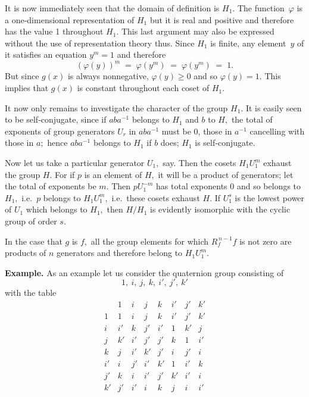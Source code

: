 \documentclass[12pt]{article}
\begin{document}
\medskip

It is now immediately seen that the domain of definition is $H_1.$ The function~$\varphi$ is a one‐dimensional representation of $H_1$ but it is real and positive and therefore has the value 1 throughout $H_1.$ This last argument may also be expressed without the use of representation theory thus. Since $H_1$ is finite, any element~$y$ of it satisfies an equation $y^m=1$ and therefore
\[
(\varphi(y))^m \;=\;\varphi(y^m)\;=\;\varphi(y^m)\;=\;1.
\]
But since $g(x)$ is always nonnegative, $\varphi(y)\ge 0$ and so $\varphi(y)=1.$ This implies that $g(x)$ is constant throughout each coset of $H_1.$

\medskip

It now only remains to investigate the character of the group $H_1.$ It is easily seen to be self‐conjugate, since if $aba^{-1}$ belongs to $H_1$ and $b$ to $H,$ the total of exponents of group generators $U_r$ in $aba^{-1}$ must be 0, those in $a^{-1}$ cancelling with those in $a;$ hence $aba^{-1}$ belongs to $H_1$ if $b$ does; $H_1$ is self‐conjugate.

\medskip

Now let us take a particular generator $U_1,$ say. Then the cosets $H_1 U_1^m$ exhaust the group $H.$ For if $p$ is an element of $H,$ it will be a product of generators; let the total of exponents be $m.$ Then $pU_1^{-m}$ has total exponents 0 and so belongs to $H_1,$ i.e.\ $p$ belongs to $H_1 U_1^m,$ i.e.\ these cosets exhaust $H.$ If $U_1^s$ is the lowest power of $U_1$ which belongs to $H_1,$ then $H/H_1$ is evidently isomorphic with the cyclic group of order $s.$

\medskip

In the case that $g$ is $f,$ all the group elements for which $R_f^{\,n-1}f$ is not zero are products of $n$ generators and therefore belong to $H_1 U_1^m.$

\medskip

\noindent
{\bf Example.} As an example let us consider the quaternion group consisting of
\[
1,\ i,\ j,\ k,\ i',\ j',\ k'
\]
with the table
\[
\begin{array}{c|ccccccc}
   & 1 & i & j & k & i' & j' & k' \\
\hline
1  & 1 & i & j & k & i' & j' & k' \\
i  & i' & k & j' & i' & 1 & k' & j \\
j  & k' & i' & j' & j' & k & 1 & i' \\
k  & j & i' & k' & j' & i & j' & i \\
i' & i & j' & i' & k' & 1 & i' & k \\
j' & k & i & i' & j' & k' & i' & i \\
k' & j' & i' & i & k & j & i & i'
\end{array}
\]
\textellipsis{}
\end{document}
